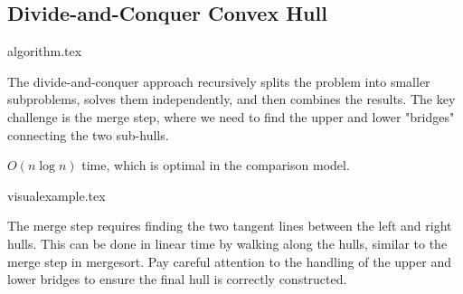 \clearpage
\subsection{Divide-and-Conquer Convex Hull}
\label{ssec:divide_and_conquer_convex_hull}

{algorithm.tex}
\label{algorithm:divide_and_conquer_convex_hull}

\begin{intuition}
The divide-and-conquer approach recursively splits the problem into smaller subproblems, solves them independently, and then combines the results. The key challenge is the merge step, where we need to find the upper and lower "bridges" connecting the two sub-hulls.
\end{intuition}



\begin{complexity}
\label{comp:divide_and_conquer}
$O(n \log n)$ time, which is optimal in the comparison model.
\end{complexity}


{visualexample.tex}
\label{visualexample:divide_and_conquer_visualexample}

\begin{implementation}
The merge step requires finding the two tangent lines between the left and right hulls. This can be done in linear time by walking along the hulls, similar to the merge step in mergesort. Pay careful attention to the handling of the upper and lower bridges to ensure the final hull is correctly constructed.
\end{implementation}
